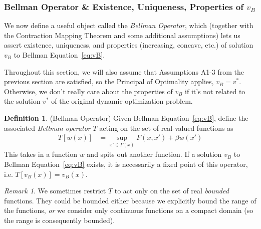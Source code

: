 \documentclass[12pt]{article}
\numberwithin{equation}{section} %
\theoremstyle{plain}
\newtheorem{prop}[thm]{Proposition}
\theoremstyle{definition}
\newtheorem{defn}[thm]{Definition}
\theoremstyle{remark}
\newtheorem*{rmk}{Remark}
\newcommand{\sB}{\mathscr{B}}
\newcommand{\R}{\mathbb{R}}
\begin{document}

\clearpage
\subsubsection{%
Bellman Operator \& Existence, Uniqueness, Properties of $v_B$
}

We now define a useful object called the \emph{Bellman Operator}, which
(together with the Contraction Mapping Theorem and some additional
assumptions) lets us assert existence, uniqueness, and properties
(increasing, concave, etc.) of solution $v_B$ to Bellman
Equation~\ref{eq:vB}.

Throughout this section, we will also assume that Assumptions A1-3 from
the previous section are satisfied, so the Principal of Optimality
applies, $v_B=v^*$. Otherwise, we don't really care about the properties
of $v_B$ if it's not related to the solution $v^*$ of the original
dynamic optimization problem.

\begin{defn}(Bellman Operator)
Given Bellman Equation~\ref{eq:vB}, define the associated
\emph{Bellman operator} $T$ acting on the set of real-valued functions
as
\begin{align}
  T[w(x)]
  &= \sup_{x'\in\Gamma(x)}
  F(x,x') + \beta w(x')
  \label{defn:bellman-operator}
\end{align}
This takes in a function $w$ and spits out another function.
If a solution $v_B$ to Bellman Equation~\ref{eq:vB} exists, it is
necessarily a fixed point of this operator, i.e. $T[v_B(x)]=v_B(x)$.
\end{defn}

\begin{rmk}
We sometimes restrict $T$ to act only on the set of real \emph{bounded}
functions. They could be bounded either because we explicitly bound the
range of the functions, \emph{or} we consider only continuous functions
on a compact domain (so the range is consequently bounded).
\end{rmk}

\end{document}
